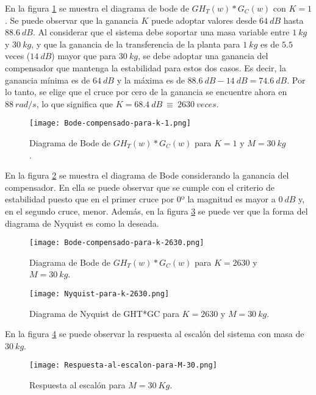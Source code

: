 \noindent En la figura \ref{fig:bode-compensado-para-k-1} se muestra el diagrama de bode de ${GH}_T(w)*G_C(w)$ con $K=1$. Se puede observar que la ganancia $K$ puede adoptar valores desde $64\:dB$ hasta $88.6\:dB$. Al considerar que el sistema debe soportar una masa variable entre $1\:kg$ y $30\:kg$, y que la ganancia de la transferencia de la planta para $1\:kg$ es de $5.5$ veces ($14\:dB$) mayor que para $30\:kg$, se debe adoptar una ganancia del compensador que mantenga la estabilidad para estos dos casos. Es decir, la ganancia m\'{i}nima es de $64\:dB$ y la m\'{a}xima es de $88.6\:dB - 14\:dB = 74.6\:dB$. Por lo tanto, se elige que el cruce por cero de la ganancia se encuentre ahora en $88\:rad/s$, lo que significa que $K=68.4\:dB\ \equiv \ 2630\:veces$.


\begin{figure}[H]
	\centering
	\texttt{[image: Bode-compensado-para-k-1.png]}
	\caption{Diagrama de Bode de $GH_T(w)*G_C(w)$ para $K=1$ y $M=30\:kg$.}
	\label{fig:bode-compensado-para-k-1}
\end{figure}


\noindent En la figura \ref{fig:bode-compensado-para-k-2630} se muestra el diagrama de Bode considerando la ganancia del compensador. En ella se puede observar que se  cumple con el criterio de estabilidad puesto que en el primer cruce por 0º la magnitud es mayor a $0\:dB$ y, en el segundo cruce, menor. Adem\'{a}s, en la figura \ref{fig:nyquist-para-k-2630} se puede ver que la forma del diagrama de Nyquist es como la deseada.

\begin{figure}[H]
	\centering
	\texttt{[image: Bode-compensado-para-k-2630.png]}
	\caption{Diagrama de Bode de $GH_T(w)*G_C(w)$ para $K=2630$ y $M=30\:kg$.}
	\label{fig:bode-compensado-para-k-2630}
\end{figure}

\begin{figure}[H]
	\centering
	\texttt{[image: Nyquist-para-k-2630.png]}
	\caption{Diagrama de Nyquist de GHT*GC para $K=2630$ y $M=30\:kg$.}
	\label{fig:nyquist-para-k-2630}
\end{figure}

\noindent En la figura \ref{fig:respuesta-al-escalon-para-M-30} se puede observar la respuesta al escal\'{o}n del sistema con masa de $30\:kg$.


\begin{figure}[H]
	\centering
	\texttt{[image: Respuesta-al-escalon-para-M-30.png]}
	\caption{Respuesta al escalón para $M=30\:Kg$.}
	\label{fig:respuesta-al-escalon-para-M-30}
\end{figure}

